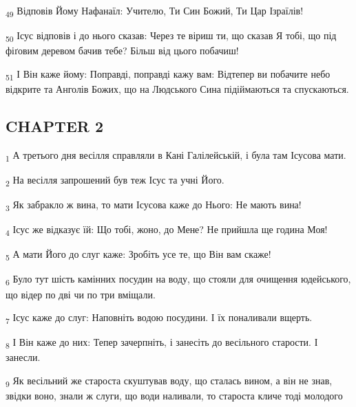 \begin{tcolorbox}
\textsubscript{49} Відповів Йому Нафанаїл: Учителю, Ти Син Божий, Ти Цар Ізраїлів!
\end{tcolorbox}
\begin{tcolorbox}
\textsubscript{50} Ісус відповів і до нього сказав: Через те віриш ти, що сказав Я тобі, що під фіґовим деревом бачив тебе? Більш від цього побачиш!
\end{tcolorbox}
\begin{tcolorbox}
\textsubscript{51} І Він каже йому: Поправді, поправді кажу вам: Відтепер ви побачите небо відкрите та Анголів Божих, що на Людського Сина підіймаються та спускаються.
\end{tcolorbox}
\subsection{CHAPTER 2}
\begin{tcolorbox}
\textsubscript{1} А третього дня весілля справляли в Кані Галілейській, і була там Ісусова мати.
\end{tcolorbox}
\begin{tcolorbox}
\textsubscript{2} На весілля запрошений був теж Ісус та учні Його.
\end{tcolorbox}
\begin{tcolorbox}
\textsubscript{3} Як забракло ж вина, то мати Ісусова каже до Нього: Не мають вина!
\end{tcolorbox}
\begin{tcolorbox}
\textsubscript{4} Ісус же відказує їй: Що тобі, жоно, до Мене? Не прийшла ще година Моя!
\end{tcolorbox}
\begin{tcolorbox}
\textsubscript{5} А мати Його до слуг каже: Зробіть усе те, що Він вам скаже!
\end{tcolorbox}
\begin{tcolorbox}
\textsubscript{6} Було тут шість камінних посудин на воду, що стояли для очищення юдейського, що відер по дві чи по три вміщали.
\end{tcolorbox}
\begin{tcolorbox}
\textsubscript{7} Ісус каже до слуг: Наповніть водою посудини. І їх поналивали вщерть.
\end{tcolorbox}
\begin{tcolorbox}
\textsubscript{8} І Він каже до них: Тепер зачерпніть, і занесіть до весільного старости. І занесли.
\end{tcolorbox}
\begin{tcolorbox}
\textsubscript{9} Як весільний же староста скуштував воду, що сталась вином, а він не знав, звідки воно, знали ж слуги, що води наливали, то староста кличе тоді молодого
\end{tcolorbox}
